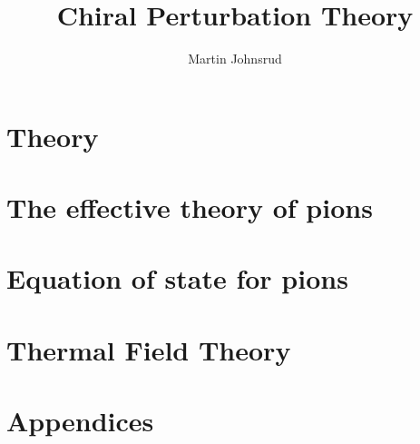 \documentclass{book}
\title{Chiral Perturbation Theory}
\author{Martin Johnsrud}
\begin{document}
\maketitle 

\tableofcontents

\chapter{Theory}







\chapter{The effective theory of pions}
\label{serction:effective_pion_lagrangian}








\chapter{Equation of state for pions}




\appendix

\chapter{Thermal Field Theory}
\label{section:thermal field theory}







\chapter{Appendices}





\end{document}
